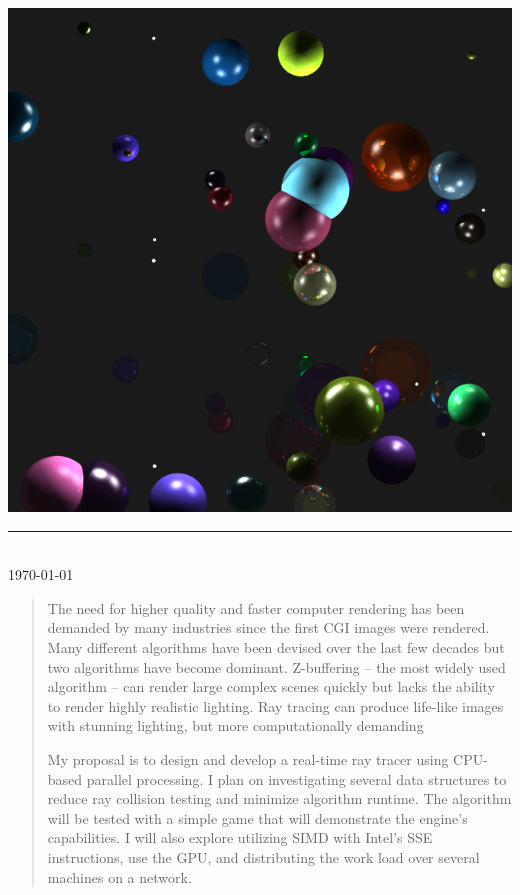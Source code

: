 \documentclass[11pt,a4paper,oneside]{article}
\newcommand{\HRule}{\rule{\linewidth}{0.5mm}}
\begin{document}
\begin{titlepage}
\begin{center}
		\begin{center}
			\includegraphics[scale=0.45]{cover.png} 
		\end{center}
	
    
        \HRule\\[0.5cm]
        { \large \today }
    \end{center}
\end{titlepage}

\begin{abstract}

The need for higher quality and faster computer rendering has been demanded by many industries since the first CGI images were rendered.  Many different algorithms have been devised over the last few decades but two algorithms have become dominant.  Z-buffering -- the most widely used algorithm -- can render large complex scenes quickly but lacks the ability to render highly realistic lighting.  Ray tracing can produce life-like images with stunning lighting, but more computationally demanding

My proposal is to design and develop a real-time ray tracer using CPU-based parallel processing.  I plan on investigating several data structures to reduce ray collision testing and minimize algorithm runtime.  The algorithm will be tested with a simple game that will demonstrate the engine's capabilities.  I will also explore utilizing SIMD with Intel's SSE instructions, use the GPU, and distributing the work load over several machines on a network.

\end{abstract}
\newpage 
\end{document}
